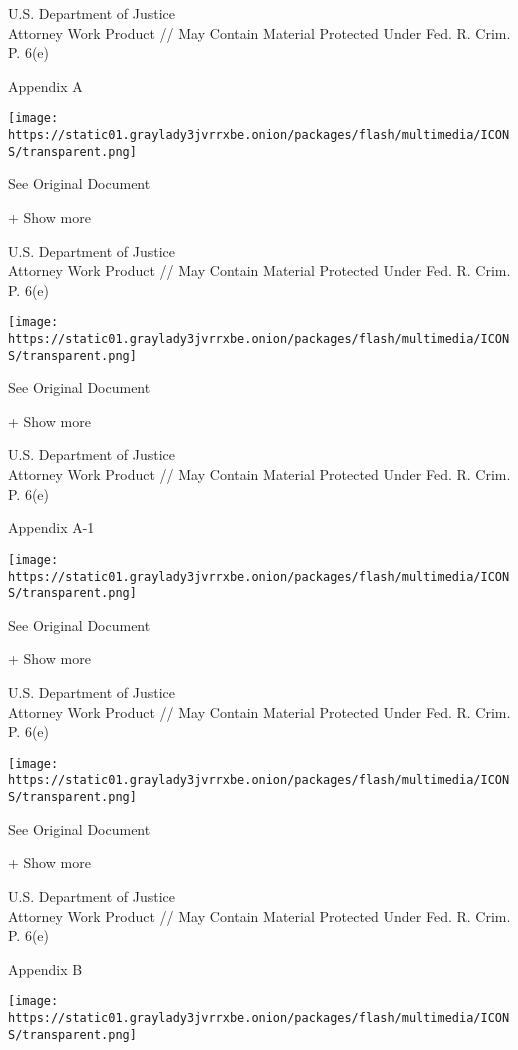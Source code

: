 U.S. Department of Justice\\
Attorney Work Product // May Contain Material Protected Under Fed. R.
Crim. P. 6(e)

Appendix A

\protect\hyperlink{}{}

\texttt{[image: https://static01.graylady3jvrrxbe.onion/packages/flash/multimedia/ICONS/transparent.png]}

See Original Document

+ Show more

U.S. Department of Justice\\
Attorney Work Product // May Contain Material Protected Under Fed. R.
Crim. P. 6(e)

\protect\hyperlink{}{}

\texttt{[image: https://static01.graylady3jvrrxbe.onion/packages/flash/multimedia/ICONS/transparent.png]}

See Original Document

+ Show more

U.S. Department of Justice\\
Attorney Work Product // May Contain Material Protected Under Fed. R.
Crim. P. 6(e)

Appendix A-1

\protect\hyperlink{}{}

\texttt{[image: https://static01.graylady3jvrrxbe.onion/packages/flash/multimedia/ICONS/transparent.png]}

See Original Document

+ Show more

U.S. Department of Justice\\
Attorney Work Product // May Contain Material Protected Under Fed. R.
Crim. P. 6(e)

\protect\hyperlink{}{}

\texttt{[image: https://static01.graylady3jvrrxbe.onion/packages/flash/multimedia/ICONS/transparent.png]}

See Original Document

+ Show more

U.S. Department of Justice\\
Attorney Work Product // May Contain Material Protected Under Fed. R.
Crim. P. 6(e)

Appendix B

\protect\hyperlink{}{}

\texttt{[image: https://static01.graylady3jvrrxbe.onion/packages/flash/multimedia/ICONS/transparent.png]}

